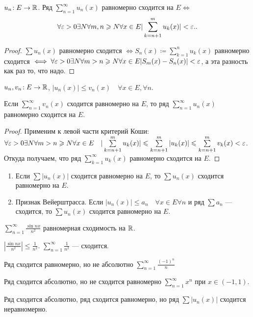\begin{theorem}
    $u_n\!: E \to \mathbb{R}$. Ряд  $\sum\limits_{n=1}^\infty u_n(x)$ равномерно сходится на  $E \iff$
     \[
    \forall \varepsilon > 0 \exists N \forall m, n \geqslant N \forall x \in E |\sum\limits_{k=n+1}^m u_k(x)| < \varepsilon.
    .\] 
\end{theorem}
\begin{proof}
    $\sum u_n(x)$ равномерно сходится  $\iff S_n(x) \coloneqq \sum\limits_{k=1}^n u_k(x)$ равномерно сходится  $\iff \forall \varepsilon > 0 \exists N \forall m > n \geqslant N \forall x \in E |S_m(x) - S_n(x)| < \varepsilon$, а эта разность как раз то, что надо.
\end{proof}

\begin{theorem}
   $u_n, v_n\!: E \to \mathbb{R}$,  $|u_n(x)| \le v_n(x) \quad \forall x \in E, \forall n$.

   Если $\sum\limits_{n=1}^\infty v_n(x)$ сходится равномерно на  $E$, то ряд  $\sum\limits_{n=1}^\infty u_n(x)$ равномерно сходится на  $E$.
\end{theorem}
\begin{proof}
    Применим к левой части критерий Коши: $\forall \varepsilon > 0 \exists N \forall m > n \geqslant N \forall x \in E \quad |\sum\limits_{k=n+1}^m u_k(x)| \leqslant \sum\limits_{k=n+1}^m |u_k(x)|\leqslant \sum\limits_{k=n+1}^m v_k(x)< \varepsilon$. Откуда получаем, что ряд $\sum\limits_{k=1}^\infty u_k(x) $ равномерно сходится на  $E$.
\end{proof}
\begin{consequence}
    \begin{enumerate}
        \item Если $\sum |u_n(x)|$ сходится равномерно на  $E$, то  $\sum u_n(x)$ сходится равномерно на  $E$. 
        \item Признак Вейерштрасса. Если  $|u_n(x)| \le a_n \quad \forall x \in E \forall n$ и ряд $\sum a_n$ --- сходится, то  $\sum u_n(x)$ сходится равномерно на  $E$.
    \end{enumerate}
\end{consequence}
\begin{example}
    $\sum\limits_{n=1}^\infty \frac{\sin nx}{n^2}$ равномерная сходимость на $\mathbb{R}$.

     $\left| \frac{\sin nx}{n^2}\right| \le \frac{1}{n^2}$. $\sum\limits_{n=1}^\infty \frac{1}{n^2}$ --- сходится.
\end{example}
\begin{remark}
    Ряд сходится равномерно, но не абсолютно $\sum\limits_{n=1}^\infty \frac{(-1)^n}{n}$

    Ряд сходится абсолютно, но не сходится равномерно $\sum\limits_{n=1}^\infty x^n$ при $x \in (-1, 1)$.

    Ряд сходится абсолютно, ряд сходится равномерно, но ряд $\sum |u_n(x)|$ сходится неравномерно.
\end{remark}

